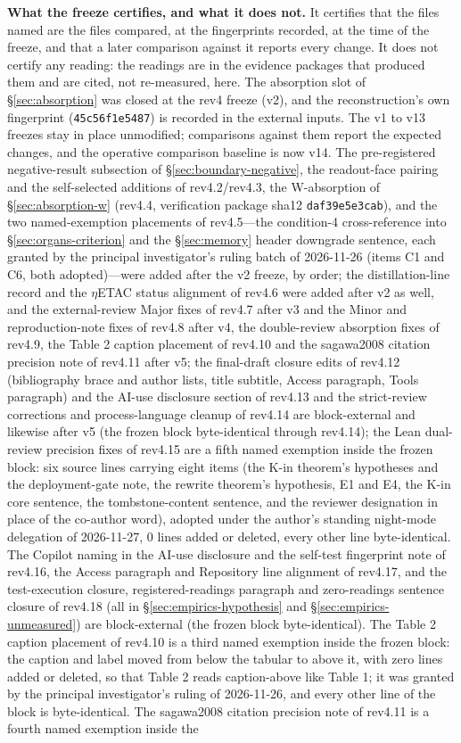 \documentclass[11pt,a4paper]{article}
\begin{document}
\textbf{What the freeze certifies, and what it does not.} It certifies that the files named are the files compared, at the fingerprints recorded, at the time of the freeze, and that a later comparison against it reports every change. It does not certify any reading: the readings are in the evidence packages that produced them and are cited, not re-measured, here. The absorption slot of \S\ref{sec:absorption} was closed at the rev4 freeze (v2), and the reconstruction's own fingerprint (\texttt{45c56f1e5487}) is recorded in the external inputs. The v1 to v13 freezes stay in place unmodified; comparisons against them report the expected changes, and the operative comparison baseline is now v14. The pre-registered negative-result subsection of \S\ref{sec:boundary-negative}, the readout-face pairing and the self-selected additions of rev4.2/rev4.3, the W-absorption of \S\ref{sec:absorption-w} (rev4.4, verification package sha12 \texttt{daf39e5e3cab}), and the two named-exemption placements of rev4.5---the condition-4 cross-reference into \S\ref{sec:organs-criterion} and the \S\ref{sec:memory} header downgrade sentence, each granted by the principal investigator's ruling batch of 2026-11-26 (items C1 and C6, both adopted)---were added after the v2 freeze, by order; the distillation-line record and the $\eta$ETAC status alignment of rev4.6 were added after v2 as well, and the external-review Major fixes of rev4.7 after v3 and the Minor and reproduction-note fixes of rev4.8 after v4, the double-review absorption fixes of rev4.9, the Table 2 caption placement of rev4.10 and the sagawa2008 citation precision note of rev4.11 after v5; the final-draft closure edits of rev4.12 (bibliography brace and author lists, title subtitle, Access paragraph, Tools paragraph) and the AI-use disclosure section of rev4.13 and the strict-review corrections and process-language cleanup of rev4.14 are block-external and likewise after v5 (the frozen block byte-identical through rev4.14); the Lean dual-review precision fixes of rev4.15 are a fifth named exemption inside the frozen block: six source lines carrying eight items (the K-in theorem's hypotheses and the deployment-gate note, the rewrite theorem's hypothesis, E1 and E4, the K-in core sentence, the tombstone-content sentence, and the reviewer designation in place of the co-author word), adopted under the author's standing night-mode delegation of 2026-11-27, 0 lines added or deleted, every other line byte-identical. The Copilot naming in the AI-use disclosure and the self-test fingerprint note of rev4.16, the Access paragraph and Repository line alignment of rev4.17, and the test-execution closure, registered-readings paragraph and zero-readings sentence closure of rev4.18 (all in \S\ref{sec:empirics-hypothesis} and \S\ref{sec:empirics-unmeasured}) are block-external (the frozen block byte-identical). The Table 2 caption placement of rev4.10 is a third named exemption inside the frozen block: the caption and label moved from below the tabular to above it, with zero lines added or deleted, so that Table 2 reads caption-above like Table 1; it was granted by the principal investigator's ruling of 2026-11-26, and every other line of the block is byte-identical. The sagawa2008 citation precision note of rev4.11 is a fourth named exemption inside the 
\end{document}
